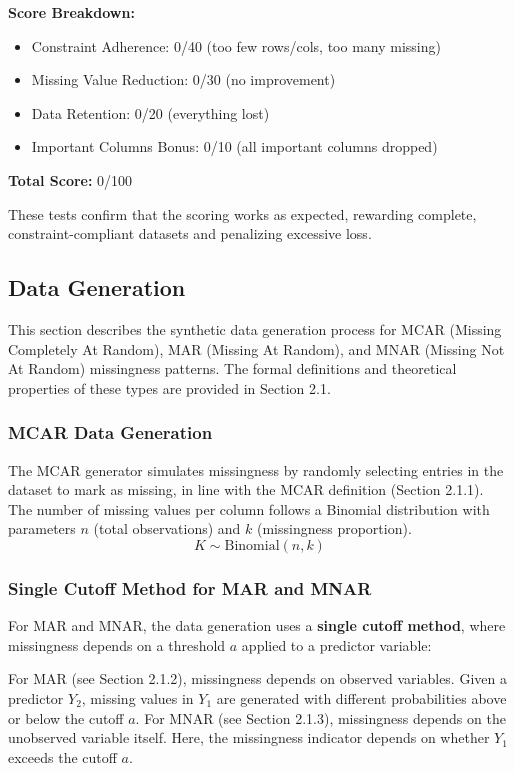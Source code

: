 \documentclass[a4paper,12pt]{article}
\begin{document}
\textbf{Score Breakdown:}
\begin{itemize}
    \item Constraint Adherence: 0/40 (too few rows/cols, too many missing)
    \item Missing Value Reduction: 0/30 (no improvement)
    \item Data Retention: 0/20 (everything lost)
    \item Important Columns Bonus: 0/10 (all important columns dropped)
\end{itemize}

\textbf{Total Score:} 0/100

These tests confirm that the scoring works as expected, rewarding complete, constraint-compliant datasets and penalizing excessive loss.

\subsection{Data Generation}

This section describes the synthetic data generation process for  MCAR
(Missing Completely At Random), MAR (Missing At Random), and MNAR (Missing
Not At Random) missingness patterns. The formal definitions and theoretical properties of these types are provided in Section 2.1.

\subsubsection{MCAR Data Generation}
The MCAR generator simulates missingness by randomly selecting entries in the dataset to mark as missing, in line with the MCAR definition (Section 2.1.1). The number of missing values per column follows a Binomial distribution with parameters \(n\) (total observations) and \(k\) (missingness proportion). ~\cite{24}
\[ 
K \sim \text{Binomial}(n, k)
\]

\subsubsection{Single Cutoff Method for MAR and MNAR}
For MAR and MNAR, the data generation uses a \textbf{single cutoff method}, where missingness depends on a threshold \(a\) applied to a predictor variable:

For MAR (see Section 2.1.2), missingness depends on observed variables. Given a predictor \(Y_2\), missing values in \(Y_1\) are generated with different probabilities above or below the cutoff \(a\).
For MNAR (see Section 2.1.3), missingness depends on the unobserved variable itself. Here, the missingness indicator depends on whether \(Y_1\) exceeds the cutoff \(a\).
\end{document}
